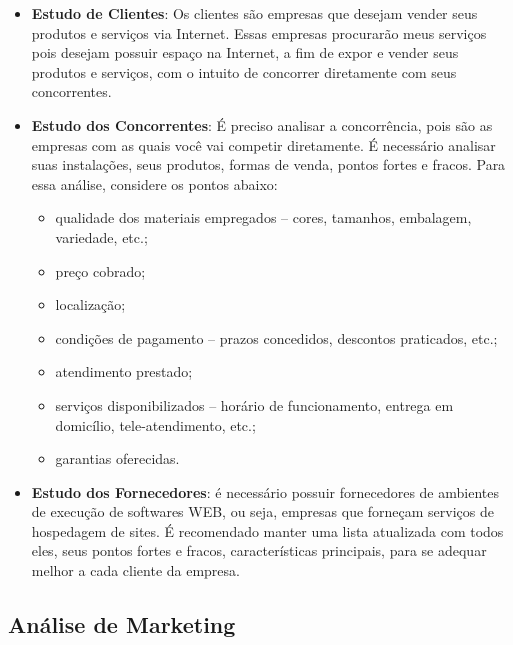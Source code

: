 \documentclass[12pt]{article}
\begin{document}
\begin{itemize}

	\item \textbf{Estudo de Clientes}: Os clientes são empresas que desejam vender seus produtos e serviços via Internet. Essas empresas
	procurarão meus serviços pois desejam possuir espaço na Internet, a fim de expor e vender seus produtos e serviços, com o intuito de
	concorrer diretamente com seus concorrentes.

	\item \textbf{Estudo dos Concorrentes}: É preciso analisar a concorrência, pois são as empresas com as quais você vai competir diretamente.
	É necessário analisar suas instalações, seus produtos, formas de venda, pontos fortes e fracos. Para essa análise, considere os pontos abaixo:

	\begin{itemize}

		\item qualidade dos materiais empregados – cores, tamanhos, embalagem, variedade, etc.;
		\item preço cobrado;
		\item localização;
		\item condições de pagamento – prazos concedidos, descontos praticados, etc.;
		\item atendimento prestado;
		\item serviços disponibilizados – horário de funcionamento, entrega em domicílio, tele-atendimento, etc.;
		\item garantias oferecidas.

	\end{itemize}

	\item \textbf{Estudo dos Fornecedores}: é necessário possuir fornecedores de ambientes de execução de softwares
	WEB, ou seja, empresas que forneçam serviços de hospedagem de sites. É recomendado manter uma lista atualizada
	com todos eles, seus pontos fortes e fracos, características principais, para se adequar melhor a cada cliente da empresa.

\end{itemize}


\subsection{Análise de Marketing}
\end{document}
